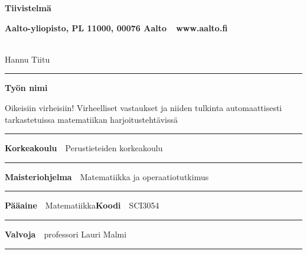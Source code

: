   \begin{spacing}{.88}

  {\parindent0pt %

  {\fontsize{13.9pt}{13.9pt}\selectfont
  \vspace{-8.9mm}\hfill{\bfseries\sffamily\lsstyle Tiivistelmä}}

  {\fontsize{9.48pt}{9.48pt}\selectfont
  \vspace{.9mm}\hfill{\bfseries\sffamily\lsstyle Aalto-yliopisto, PL 11000, 00076 Aalto~~\textcolor{aaltoGray}{www.aalto.fi}}}

  \\
  {\small Hannu Tiitu}

  \vspace{-2.4mm}\rule{\textwidth}{.75pt}

  {\fontsize{10.5pt}{10.5pt}\bfseries\sffamily\lsstyle Työn nimi}\\
  \parbox[t]{\textwidth}{\raggedright\small Oikeisiin virheisiin! Virheelliset vastaukset ja niiden tulkinta automaattisesti tarkastetuissa matematiikan harjoitustehtävissä}

  \vspace{.5mm}\rule{\textwidth}{.75pt}

  {\fontsize{10.5pt}{10.5pt}\bfseries\sffamily\lsstyle Korkeakoulu}~~{\small Perustieteiden korkeakoulu}

  \vspace{-2.4mm}\rule{\textwidth}{.75pt}

  {\fontsize{10.5pt}{10.5pt}\bfseries\sffamily\lsstyle Maisteriohjelma}~~{\small Matematiikka ja operaatiotutkimus}

  \vspace{-2.4mm}\rule{\textwidth}{.75pt}

  {\fontsize{10.5pt}{10.5pt}\bfseries\sffamily\lsstyle Pääaine}~~{\small Matematiikka}\hfill{\fontsize{10.5pt}{10.5pt}\bfseries\sffamily\lsstyle Koodi}~~{\small SCI3054}

  \vspace{-2.4mm}\rule{\textwidth}{.75pt}

  {\fontsize{10.5pt}{10.5pt}\bfseries\sffamily\lsstyle Valvoja}~~{\small professori Lauri Malmi}

  \vspace{-2.4mm}\rule{\textwidth}{.75pt}

}
\end{spacing}
